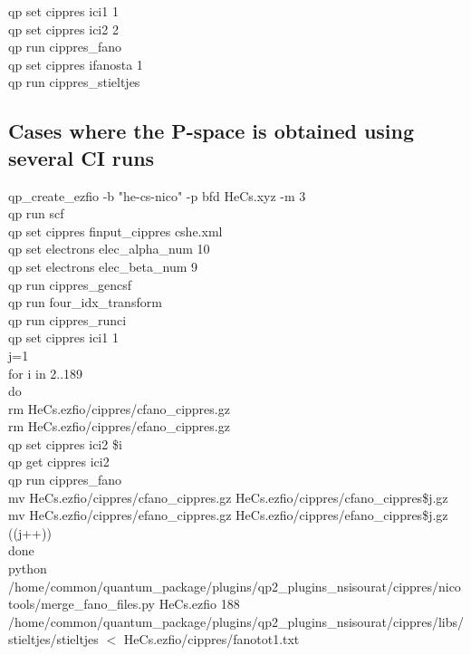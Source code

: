 \documentclass[a4paper, 10 pt]{report}
\begin{document}
\noindent qp set cippres ici1 1\\
qp set cippres ici2 2\\
qp run cippres\_fano\\
qp set cippres ifanosta 1  \\
qp run cippres\_stieltjes  \\

\subsection{Cases where the P-space is obtained using several CI runs}

\noindent qp\_create\_ezfio -b "he-cs-nico" -p bfd HeCs.xyz -m 3\\
qp run scf\\
qp set cippres finput\_cippres cshe.xml\\
qp set electrons elec\_alpha\_num 10\\
qp set electrons elec\_beta\_num 9\\
qp run cippres\_gencsf\\
qp run four\_idx\_transform\\
qp run cippres\_runci\\
qp set cippres ici1 1\\
j=1\\
for i in {2..189}\\
do\\
rm HeCs.ezfio/cippres/cfano\_cippres.gz\\
rm HeCs.ezfio/cippres/efano\_cippres.gz\\
qp set cippres ici2 \$i\\
qp get cippres ici2\\
qp run cippres\_fano\\
mv HeCs.ezfio/cippres/cfano\_cippres.gz HeCs.ezfio/cippres/cfano\_cippres\${j}.gz\\
mv HeCs.ezfio/cippres/efano\_cippres.gz HeCs.ezfio/cippres/efano\_cippres\${j}.gz\\
((j++))\\
done\\
python /home/common/quantum\_package/plugins/qp2\_plugins\_nsisourat/cippres/nicotools/merge\_fano\_files.py HeCs.ezfio 188\\
/home/common/quantum\_package/plugins/qp2\_plugins\_nsisourat/cippres/libs/stieltjes/stieltjes $<$ HeCs.ezfio/cippres/fanotot1.txt\\
\end{document}
